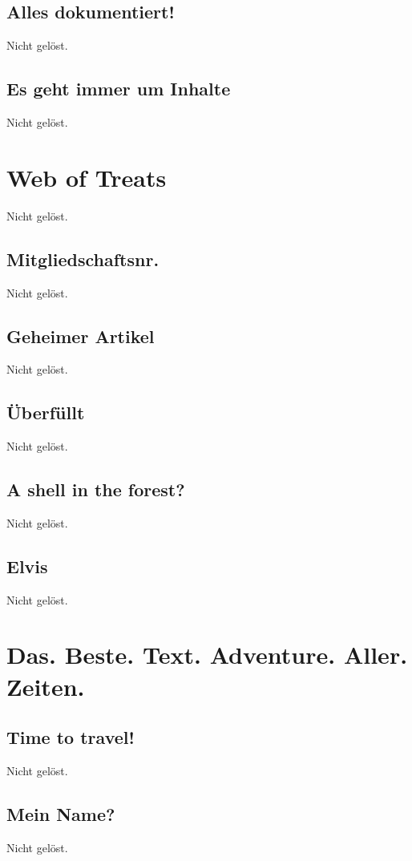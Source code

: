 \documentclass[12pt,a4paper,titlepage,oneside]{scrartcl}
\begin{document}
\subsection{Alles dokumentiert!}
Nicht gelöst.

\subsection{Es geht immer um Inhalte}
Nicht gelöst.


\section{Web of Treats}
Nicht gelöst.

\subsection{Mitgliedschaftsnr.}
Nicht gelöst.

\subsection{Geheimer Artikel}
Nicht gelöst.

\subsection{\"Uberf\"ullt}
Nicht gelöst.

\subsection{A shell in the forest?}
Nicht gelöst.

\subsection{Elvis}
Nicht gelöst.


\section{Das. Beste. Text. Adventure. Aller. Zeiten.}

\subsection{Time to travel!}
Nicht gelöst.

\subsection{Mein Name?}
Nicht gelöst.
\end{document}
